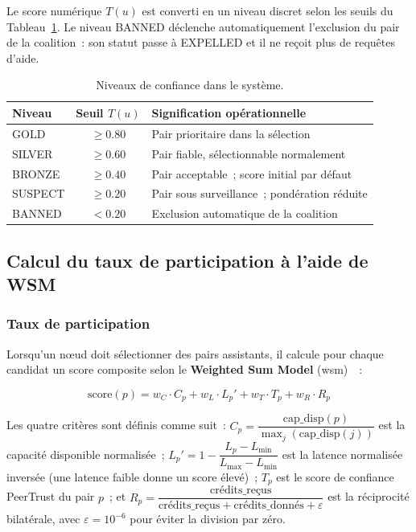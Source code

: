 Le score numérique $T(u)$ est converti en un niveau discret selon les seuils du Tableau~\ref{tab:trust_levels}. Le niveau BANNED déclenche automatiquement l'exclusion du pair de la coalition~: son statut passe à {EXPELLED} et il ne reçoit plus de requêtes d'aide.

\begin{table}[H]
\centering
\caption{Niveaux de confiance dans le système.}
\label{tab:trust_levels}
\small
\renewcommand{\arraystretch}{1.3}
\begin{tabular}{|l|c|l|}
\hline
\textbf{Niveau} & \textbf{Seuil $T(u)$} & \textbf{Signification opérationnelle} \\
\hline
GOLD    & $\geq 0.80$ & Pair prioritaire dans la sélection \\
SILVER  & $\geq 0.60$ & Pair fiable, sélectionnable normalement \\
BRONZE  & $\geq 0.40$ & Pair acceptable~; score initial par défaut \\
SUSPECT & $\geq 0.20$ & Pair sous surveillance~; pondération réduite \\
BANNED  & $< 0.20$    & Exclusion automatique de la coalition \\
\hline
\end{tabular}
\end{table}

\subsection{Calcul du taux de participation à l'aide de WSM}
\label{sec:wsm}

\subsubsection{Taux de participation}

Lorsqu'un nœud doit sélectionner des pairs assistants, il calcule pour chaque candidat un score composite selon le \textbf{Weighted Sum Model} (\gls{wsm})~\parencite{hwang1981wsm}~:

\begin{equation}
\label{eq:wsm}
\text{score}(p) = w_C \cdot C_p + w_L \cdot L_p' + w_T \cdot T_p + w_R \cdot R_p
\end{equation}

Les quatre critères sont définis comme suit~: $C_p = \dfrac{\text{cap\_disp}(p)}{\max_j(\text{cap\_disp}(j))}$ est la capacité disponible normalisée~; $L_p' = 1 - \dfrac{L_p - L_{\min}}{L_{\max} - L_{\min}}$ est la latence normalisée inversée (une latence faible donne un score élevé)~; $T_p$ est le score de confiance PeerTrust du pair $p$~; et $R_p = \dfrac{\text{crédits\_reçus}}{\text{crédits\_reçus} + \text{crédits\_donnés} + \varepsilon}$ est la réciprocité bilatérale, avec $\varepsilon = 10^{-6}$ pour éviter la division par zéro.
